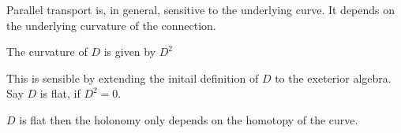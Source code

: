Parallel transport is, in general, sensitive to the underlying curve. 
It depends on the underlying curvature of the connection. 

\begin{definition}
The curvature of $D$ is given by $D^2$ 
\end{definition}
This is sensible by extending the initail definition of $ D$ to the exeterior algebra. 
Say $D$ is flat, if $ D^2 = 0 $. 

\begin{theorem}
    $D$ is flat then the holonomy only depends on the homotopy of the curve. 
\end{theorem}





 

